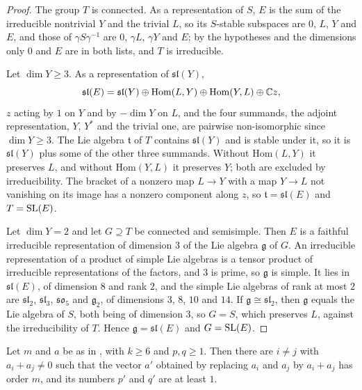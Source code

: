 \begin{proof}
The group $T$ is connected. As a representation of $S$, $E$ is
the sum of the irreducible nontrivial $Y$ and the trivial $L$, so its
$S$-stable subspaces are $0$, $L$, $Y$ and $E$, and those of
$\gamma S\gamma^{-1}$ are $0$, $\gamma L$, $\gamma Y$ and $E$; by the
hypotheses and the dimensions only $0$ and $E$ are in both lists, and $T$ is
irreducible.

Let $\dim Y\ge3$. As a representation of $\mathfrak{sl}(Y)$,
\[
  \mathfrak{sl}(E)=\mathfrak{sl}(Y)\oplus\mathrm{Hom}(L,Y)\oplus
  \mathrm{Hom}(Y,L)\oplus\mathbb{C} z,
\]
$z$ acting by $1$ on $Y$ and by $-\dim Y$ on $L$, and the four summands, the
adjoint representation, $Y$, $Y^{*}$ and the trivial one, are pairwise
non-isomorphic since $\dim Y\ge3$. The Lie algebra $\mathfrak{t}$ of $T$
contains $\mathfrak{sl}(Y)$ and is stable under it, so it is
$\mathfrak{sl}(Y)$ plus some of the other three summands. Without
$\mathrm{Hom}(L,Y)$ it preserves $L$, and without $\mathrm{Hom}(Y,L)$ it
preserves $Y$; both are excluded by irreducibility. The bracket of a nonzero
map $L\to Y$ with a map $Y\to L$ not vanishing on its image has a nonzero
component along $z$, so $\mathfrak{t}=\mathfrak{sl}(E)$ and $T=\operatorname{SL}(E)$.

Let $\dim Y=2$ and let $G\supseteq T$ be connected and semisimple. Then $E$
is a faithful irreducible representation of dimension $3$ of the Lie algebra
$\mathfrak{g}$ of $G$. An irreducible representation of a product of simple
Lie algebras is a tensor product of irreducible representations of the
factors, and $3$ is prime, so $\mathfrak{g}$ is simple. It lies in
$\mathfrak{sl}(E)$, of dimension $8$ and rank $2$, and the simple Lie
algebras of rank at most $2$ are $\mathfrak{sl}_{2}$, $\mathfrak{sl}_{3}$,
$\mathfrak{so}_{5}$ and $\mathfrak{g}_{2}$, of dimensions $3$, $8$, $10$ and
$14$. If $\mathfrak{g}\cong\mathfrak{sl}_{2}$, then $\mathfrak{g}$ equals the
Lie algebra of $S$, both being of dimension $3$, so $G=S$, which preserves
$L$, against the irreducibility of $T$. Hence $\mathfrak{g}=\mathfrak{sl}(E)$
and $G=\operatorname{SL}(E)$.
\end{proof}

\begin{lemma}\label{lem:merge}
Let $m$ and $a$ be as in , with $k\ge6$ and $p,q\ge1$.
Then there are $i\ne j$ with $a_{i}+a_{j}\ne0$ such that the vector $a'$
obtained by replacing $a_{i}$ and $a_{j}$ by $a_{i}+a_{j}$ has order $m$, and
its numbers $p'$ and $q'$ are at least $1$.
\end{lemma}

